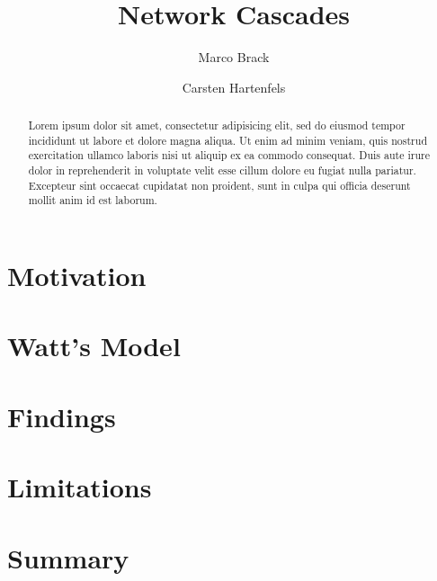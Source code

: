 \documentclass{sig-alternate-05-2015}
\begin{document}
\title{Network Cascades}
\author{Marco Brack \and Carsten Hartenfels}
\maketitle

\begin{abstract}
  Lorem ipsum dolor sit amet, consectetur adipisicing elit, sed do eiusmod tempor incididunt ut labore et dolore magna aliqua. Ut enim ad minim veniam, quis nostrud exercitation ullamco laboris nisi ut aliquip ex ea commodo consequat. Duis aute irure dolor in reprehenderit in voluptate velit esse cillum dolore eu fugiat nulla pariatur. Excepteur sint occaecat cupidatat non proident, sunt in culpa qui officia deserunt mollit anim id est laborum. \cite{simplemodel}
\end{abstract}

\section{Motivation}

\section{Watt's Model}

\section{Findings}

\section{Limitations}

\section{Summary}



\end{document}
